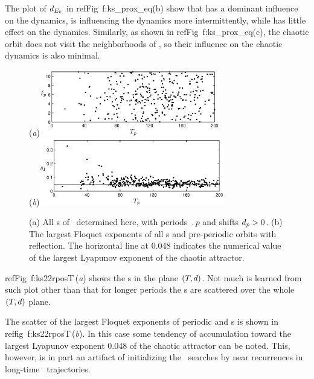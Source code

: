The plot of $d_{E_{k}}$ in refFig~{f:ks\_prox\_eq}(b) show that  has a dominant
influence on the dynamics,  is influencing the dynamics more intermittently, while
 has little effect on the dynamics.  Similarly, as shown in refFig~{f:ks\_prox\_eq}(c),
the chaotic orbit does not visit the neighborhoods of \reqva , so their influence on
the chaotic dynamics is also minimal.

\begin{figure}[t]
\begin{center}
(\textit{a})\hspace{1ex}\includegraphics[width=0.7\textwidth, clip=true]
                            {../figs/ks22_rpos_Tdelta.eps}\\
(\textit{b})\includegraphics[width=0.72\textwidth, clip=true]
                            {../figs/ks22_rpos_lyap.eps}
\end{center}
\caption{
(a) All \rpo s of \KSe\ determined here, with periods $\period{p}$ and
shifts $d_p > 0$.
(b) The largest Floquet exponents  of all
\rpo s and pre-periodic orbits with reflection.
The horizontal line at $0.048$
indicates the numerical value  of the largest
Lyapunov exponent of the chaotic attractor.
} \label{f:ks22rposT}
\end{figure}

refFig~{f:ks22rposT}\,(\textit{a}) shows the \rpo s in the plane
$({T_{}},d)$.  Not much is learned from such plot other than
that for longer periods the \rpo s are scattered over the
whole $({T_{}},d)$ plane.

The scatter of the largest Floquet exponents
of periodic and \rpo s is shown in reffig~{f:ks22rposT}\,(\textit{b}).
In this case some tendency of accumulation toward the largest
Lyapunov exponent 0.048 of the chaotic attractor
can be noted.  This, however, is in part an artifact of initializing
the \rpo\ searches by near recurrences in long-time \statesp\
trajectories.


